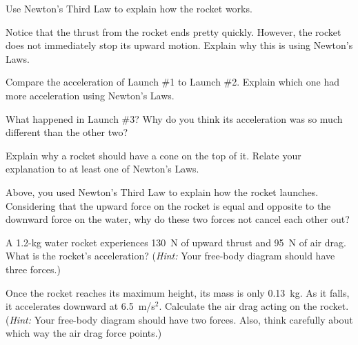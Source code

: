 \documentclass[10pt]{exam}
\begin{document}
\begin{questions}
  \question
    Use Newton's Third Law to explain how the rocket works.
    \vs

  \question
    Notice that the thrust from the rocket ends pretty quickly.  However, the rocket does not immediately stop its upward motion.  Explain why this is using Newton's Laws.
    \vs

  \question
    Compare the acceleration of Launch \#1 to Launch \#2.  Explain which one had more acceleration using Newton's Laws.
    \vs

  \question
    What happened in Launch \#3?  Why do you think its acceleration was so much different than the other two?
    \vs

  \pagebreak

  \question
    Explain why a rocket should have a cone on the top of it.  Relate your explanation to at least one of Newton's Laws.
    \vs

  \question
    Above, you used Newton's Third Law to explain how the rocket launches.  Considering that the upward force on the rocket is equal and opposite to the downward force on the water, why do these two forces not cancel each other out?
    \vs
  


  \question
    A 1.2-kg water rocket experiences 130~N of upward thrust and 95~N of air drag.  What is the rocket's acceleration?  (\emph{Hint:} Your free-body diagram should have three forces.)
    \vs[3]

  \question
    Once the rocket reaches its maximum height, its mass is only 0.13~kg.  As it falls, it accelerates downward at 6.5~m/s$^2$.  Calculate the air drag acting on the rocket.  (\emph{Hint:} Your free-body diagram should have two forces.  Also, think carefully about which way the air drag force points.)
    \vs[3]

\end{questions}
\end{document}
